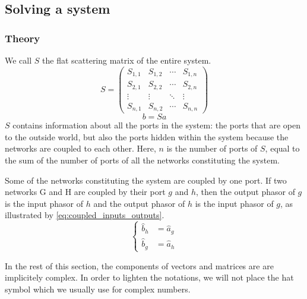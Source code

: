 \subsection{Solving a system}
\label{sec:solving_a_system}



\subsubsection{Theory}

We call $S$ the flat scattering matrix of the entire system.
\begin{equation*}
    S =
    \begin{pmatrix}
        S_{1, 1} & S_{1, 2} & \cdots & S_{1, n} \\
        S_{2, 1} & S_{2, 2} & \cdots & S_{2, n} \\
        \vdots   & \vdots   & \ddots & \vdots \\
        S_{n, 1} & S_{n, 2} & \cdots & S_{n, n}
    \end{pmatrix}
\end{equation*}
\begin{equation*}
    b = Sa
\end{equation*}
$S$ contains information about all the ports in the system: the ports that are open to the outside world, but also the ports hidden within the system because the networks are coupled to each other.
Here, $n$ is the number of ports of $S$, equal to the sum of the number of ports of all the networks constituting the system.

Some of the networks constituting the system are coupled by one port.
If two networks G and H are coupled by their port $g$ and $h$, then the output phasor of $g$ is the input phasor of $h$ and the output phasor of $h$ is the input phasor of $g$, as illustrated by \cref{eq:coupled_inputs_outputs}.
\begin{equation}
    \left\lbrace
    \begin{aligned}
        \hat{b}_h &= \hat{a}_g \\
        \hat{b}_g &= \hat{a}_h
    \end{aligned}
    \right.
    \label{eq:coupled_inputs_outputs}
\end{equation}

In the rest of this section, the components of vectors and matrices are are implicitely complex.
In order to lighten the notations, we will not place the hat symbol which we usually use for complex numbers.

